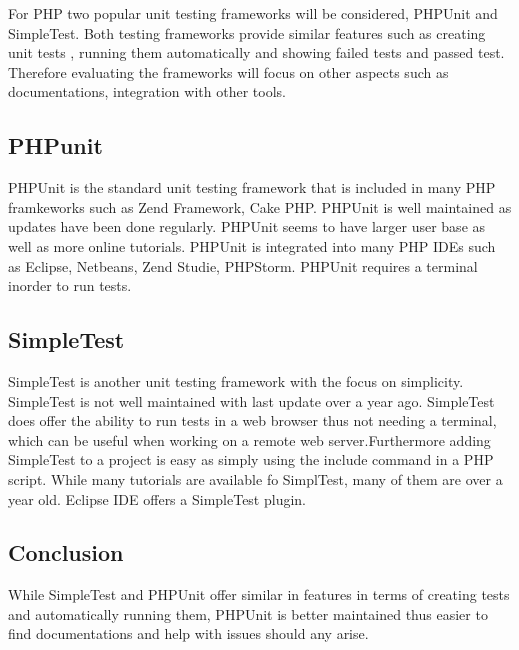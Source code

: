 \documentclass[a4paper,oneside,11pt]{report}
\begin{document}
For PHP two popular unit testing frameworks will be considered, PHPUnit and SimpleTest. Both testing frameworks provide similar features such as creating unit tests , running them automatically and showing failed tests and passed test. Therefore evaluating the frameworks will focus on other aspects such as documentations, integration with other tools.
\subsection{PHPunit}
PHPUnit is the standard unit testing framework that is included in many PHP framkeworks such as Zend Framework, Cake PHP. PHPUnit is well maintained as   updates have been done regularly. PHPUnit seems to have larger user base as well as more online tutorials. PHPUnit is integrated into many PHP IDEs  such as Eclipse, Netbeans, Zend Studie, PHPStorm. PHPUnit requires a terminal inorder to run tests.
\subsection{SimpleTest}
SimpleTest is another unit testing framework with the focus on simplicity. SimpleTest is not well maintained with last update over a year ago. SimpleTest does offer the ability to run tests in a web browser thus not needing a terminal, which can be useful when working on a remote web server.Furthermore adding SimpleTest to a project is easy as simply using the include command in a PHP script. While many tutorials are available fo SimplTest, many of them are over a year  old. Eclipse IDE offers a SimpleTest plugin.

\subsection{Conclusion}
While SimpleTest and PHPUnit offer similar in features in terms of creating tests and automatically running them, PHPUnit is better maintained thus easier to find documentations and help with issues should any arise. 


\newpage
\end{document}
